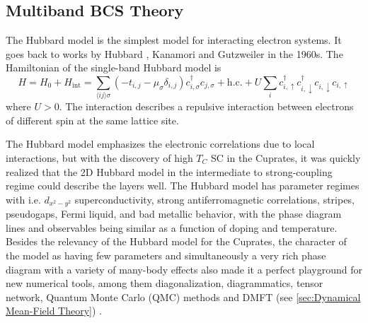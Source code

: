 \documentclass[../notes.tex]{subfiles}
\begin{document}
\subsection*{Multiband BCS Theory}

The Hubbard model is the simplest model for interacting electron systems.
It goes back to works by Hubbard \cite{hubbardElectronCorrelationsNarrow1963}, Kanamori \cite{kanamoriElectronCorrelationFerromagnetism1963} and Gutzweiler \cite{gutzwillerEffectCorrelationFerromagnetism1963} in the 1960s.
The Hamiltonian of the  single-band Hubbard model is
\begin{equation}
	H = H_0 + H_{\mathrm{int}} 
	= \sum_{\langle i j \rangle \sigma} \left(-t_{i, j} - \mu_{\sigma} \delta_{i, j}\right) c_{i, \sigma}^{\dagger} c_{j, \sigma} + \mathrm{h.c.} + U \sum_{i} c_{i, \uparrow}^{\dagger} c_{i, \downarrow}^{\dagger} c_{i, \downarrow} c_{i, \uparrow}
	\label{eq:Hubbard interaction repulsive}
\end{equation}
where \(U > 0\).
The interaction describes a repulsive interaction between electrons of different spin at the same lattice site.

The Hubbard model emphasizes the electronic correlations due to local interactions, but with the discovery of high \(T_C\) SC in the Cuprates, it was quickly realized that the 2D Hubbard model in the intermediate to strong-coupling regime could describe the  layers \cite{zhangEffectiveHamiltonianSuperconducting1988} well.
The Hubbard model has parameter regimes with i.e. \(d_{x^2 - y^2}\) superconductivity, strong antiferromagnetic correlations, stripes, pseudogaps, Fermi liquid, and bad metallic behavior, with the phase diagram lines and observables being similar as a function of doping and temperature. 
Besides the relevancy of the Hubbard model for the Cuprates, the character of the model as having few parameters and simultaneously a very rich phase diagram with a variety of many-body effects also made it a perfect playground for new numerical tools, among them diagonalization, diagrammatics, tensor network, Quantum Monte Carlo (QMC) methods and DMFT (see \cref{sec:Dynamical Mean-Field Theory}) \cite{qinHubbardModelComputational2022}.
\end{document}
